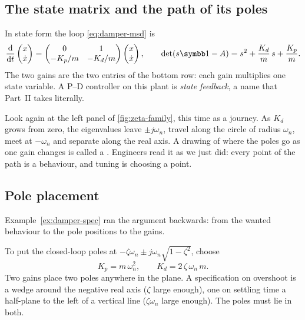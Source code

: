 \subsection{The state matrix and the path of its poles}
In state form the loop \eqref{eq:damper-msd} is
\begin{equation}\label{eq:damper-state}
  \frac{\dd}{\dd t}\begin{pmatrix} x \\ \dot x \end{pmatrix}
  = \begin{pmatrix} 0 & 1 \\ -K_p/m & -K_d/m \end{pmatrix}\begin{pmatrix} x \\ \dot x \end{pmatrix},
  \qquad \det(s\Id - A) = s^2 + \frac{K_d}{m}\,s + \frac{K_p}{m} .
\end{equation}
The two gains are the two entries of the bottom row: each gain multiplies one state variable. A P–D controller on this plant is \emph{state feedback}, a name that Part~II takes literally.

Look again at the left panel of \cref{fig:zeta-family}, this time as a journey. As $K_d$ grows from zero, the eigenvalues leave $\pm j\omega_n$, travel along the circle of radius $\omega_n$, meet at $-\omega_n$ and separate along the real axis. A drawing of where the poles go as one gain changes is called a . Engineers read it as we just did: every point of the path is a behaviour, and tuning is choosing a point.

\subsection{Pole placement}
Example~\ref{ex:damper-spec} ran the argument backwards: from the wanted behaviour to the pole positions to the gains.

\begin{result}
To put the closed-loop poles at $-\zeta\omega_n \pm j\omega_n\sqrt{1 - \zeta^2}$, choose
\begin{equation*}
  K_p = m\,\omega_n^2, \qquad K_d = 2\,\zeta\,\omega_n\,m .
\end{equation*}
Two gains place two poles anywhere in the plane. A specification on overshoot is a wedge around the negative real axis ($\zeta$ large enough), one on settling time a half-plane to the left of a vertical line ($\zeta\omega_n$ large enough). The poles must lie in both.
\end{result}

